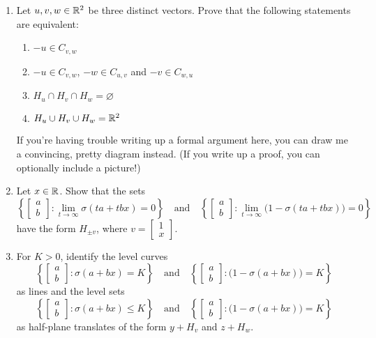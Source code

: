 \documentclass[12pt]{amsart}
\begin{document}
\begin{enumerate}\setlength\itemsep{1em}
    \item Let $u, v, w\in\mathbb{R}^2$ be three distinct vectors.
    Prove that the following statements are equivalent:
    \begin{enumerate}\setlength\itemsep{0.5em}
        \item $-u\in C_{v,w}$
        \item $-u\in C_{v,w}$, $-w\in C_{u,v}$ and $-v\in C_{w,u}$
        \item $H_u\cap H_v\cap H_w = \varnothing$
        \item $H_u\cup H_v\cup H_w = \mathbb{R}^2$
    \end{enumerate}

    \medskip\noindent
    If you're having trouble writing up a formal argument here,
    you can draw me a convincing, pretty diagram instead.
    (If you write up a proof, you can optionally include a picture!)

    \item Let $x\in\mathbb{R}$. Show that the sets
    \[
    \left\{\begin{bmatrix}a\\b\end{bmatrix}: \lim_{t\to\infty}\sigma(ta + tbx)=0\right\}
        \quad\text{and}\quad
    \left\{\begin{bmatrix}a\\b\end{bmatrix}: \lim_{t\to\infty}\big(1 - \sigma(ta + tbx)\big)=0\right\}
    \]
    have the form $H_{\pm v}$, where $v=\begin{bmatrix}
        1\\x
    \end{bmatrix}$.

    \item For $K>0$, identify the level curves
    \[
    \left\{\begin{bmatrix}a\\b\end{bmatrix}: \sigma(a + bx)=K\right\}
        \quad\text{and}\quad
    \left\{\begin{bmatrix}a\\b\end{bmatrix}: \big(1 - \sigma(a + bx)\big)=K\right\}
    \]
    as lines
    and the level sets
    \[
    \left\{\begin{bmatrix}a\\b\end{bmatrix}: \sigma(a + bx)\leq K\right\}
        \quad\text{and}\quad
    \left\{\begin{bmatrix}a\\b\end{bmatrix}: \big(1 - \sigma(a + bx)\big)=K\right\}
    \]
    as half-plane translates of the form $y+H_v$ and $z+H_w$.


\end{enumerate}
\end{document}
